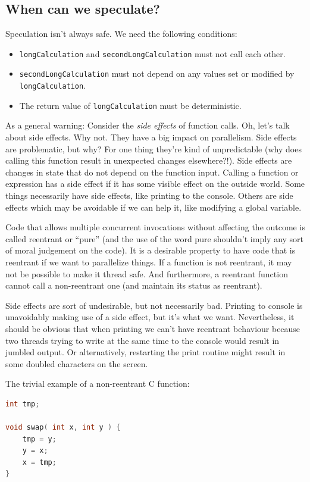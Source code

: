 \documentclass[a4paper]{report}
\begin{document}
\subsection*{When can we speculate?}
Speculation isn't always safe. We need the following conditions:
  \begin{itemize}
    \item {\tt longCalculation} and {\tt secondLongCalculation} must not call
      each other.
    \item {\tt secondLongCalculation} must not depend on
      any values set or modified by {\tt longCalculation}.
    \item The return value of {\tt longCalculation} must be deterministic.
  \end{itemize}

As a general warning: Consider the \emph{side effects} of function calls. Oh, let's talk about side effects. Why not. They have a big impact on parallelism. Side effects are problematic, but why? For one thing they're kind of unpredictable (why does calling this function result in unexpected changes elsewhere?!). Side effects are changes in state that do not depend on the function input. Calling a function or expression has a side effect if it has some visible effect on the outside world. Some things necessarily have side effects, like printing to the console. Others are side effects which may be avoidable if we can help it, like modifying a global variable.

Code that allows multiple concurrent invocations without affecting the outcome is called reentrant or ``pure'' (and the use of the word pure shouldn't imply any sort of moral judgement on the code). It is a desirable property to have code that is reentrant if we want to parallelize things. If a function is not reentrant, it may not be possible to make it thread safe. And furthermore, a reentrant function cannot call a non-reentrant one (and maintain its status as reentrant).

Side effects are sort of undesirable, but not necessarily bad. Printing to console is unavoidably making use of a side effect, but it's what we want. Nevertheless, it should be obvious that when printing we can't have reentrant behaviour because two threads trying to write at the same time to the console would result in jumbled output. Or alternatively, restarting the print routine might result in some doubled characters on the screen.

The trivial example of a non-reentrant C function:
\begin{lstlisting}[language=C]
int tmp;

void swap( int x, int y ) {
    tmp = y;
    y = x;
    x = tmp;
}
\end{lstlisting}
\end{document}
